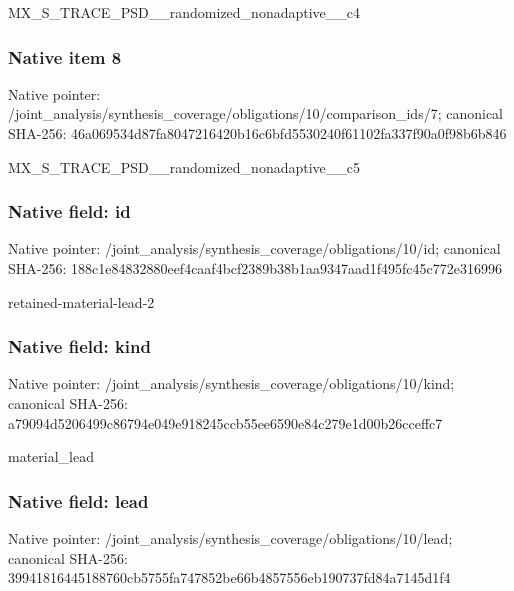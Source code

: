\documentclass[10pt,a4paper]{article}
\begin{document}
\begingroup\raggedright\sloppy MX\_\allowbreak{}S\_\allowbreak{}TRACE\_\allowbreak{}PSD\_\allowbreak{}\_\allowbreak{}randomized\_\allowbreak{}nonadaptive\_\allowbreak{}\_\allowbreak{}c4\par\endgroup

\subsubsection{Native item 8}
Native pointer: /joint\_\allowbreak{}analysis/synthesis\_\allowbreak{}coverage/obligations/10/comparison\_\allowbreak{}ids/7; canonical SHA-256: 46a069534d87fa8047216420b16c6bfd5530240f61102fa337f90a0f98b6b846

\begingroup\raggedright\sloppy MX\_\allowbreak{}S\_\allowbreak{}TRACE\_\allowbreak{}PSD\_\allowbreak{}\_\allowbreak{}randomized\_\allowbreak{}nonadaptive\_\allowbreak{}\_\allowbreak{}c5\par\endgroup

\subsubsection{Native field: id}
Native pointer: /joint\_\allowbreak{}analysis/synthesis\_\allowbreak{}coverage/obligations/10/id; canonical SHA-256: 188c1e84832880eef4caaf4bcf2389b38b1aa9347aad1f495fc45c772e316996

\begingroup\raggedright\sloppy retained-material-lead-2\par\endgroup

\subsubsection{Native field: kind}
Native pointer: /joint\_\allowbreak{}analysis/synthesis\_\allowbreak{}coverage/obligations/10/kind; canonical SHA-256: a79094d5206499c86794e049e918245ccb55ee6590e84c279e1d00b26cceffc7

\begingroup\raggedright\sloppy material\_\allowbreak{}lead\par\endgroup

\subsubsection{Native field: lead}
Native pointer: /joint\_\allowbreak{}analysis/synthesis\_\allowbreak{}coverage/obligations/10/lead; canonical SHA-256: 39941816445188760cb5755fa747852be66b4857556eb190737fd84a7145d1f4
\end{document}
